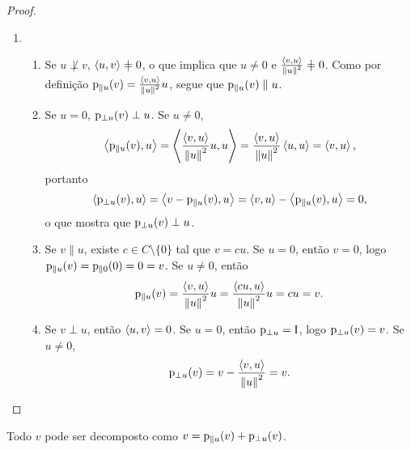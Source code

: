 \begin{proof}
\begin{enumerate}
\begin{comment}
\end{comment}


	\item	
		\begin{enumerate}
		\item Se $u \not\perp v$, $\inte{u}{v} \neq 0$, o que implica que $u \neq 0$ e $\frac{\inte{v}{u}}{\nor{u}^2} \neq 0$. Como por definição $\mathrm{p}_{\parallel u}(v) = \frac{\left\langle{v},{u}\right\rangle}{\left\Vert{u}\right\Vert^2}u$, segue que $\mathrm{p}_{\parallel u}(v) \parallel u$.
		
		\item Se $u = 0$, $\mathrm{p}_{\perp u}(v) \perp u$. Se $u \neq 0$,
	\begin{align*}
	\left\langle{\mathrm{p}_{\parallel u}(v)},{u}\right\rangle = \left\langle{\frac{\left\langle{v},{u}\right\rangle}{\left\Vert{u}\right\Vert^2}u},{u}\right\rangle = \frac{\left\langle{v},{u}\right\rangle}{\left\Vert{u}\right\Vert^2}\left\langle{u},{u}\right\rangle = \left\langle{v},{u}\right\rangle,
	\end{align*}
portanto
	\begin{align*}
	\left\langle{\mathrm{p}_{\perp u}(v)},{u}\right\rangle = \left\langle{v - \mathrm{p}_{\parallel u}(v)},{u}\right\rangle = \left\langle{v},{u}\right\rangle - \left\langle{\mathrm{p}_{\parallel u}(v)},{u}\right\rangle = 0,
	\end{align*}
o que mostra que $\mathrm{p}_{\perp u}(v) \perp u$.
		
		\item Se $v \parallel u$, existe $c \in C \setminus \{0\}$ tal que $v = cu$. Se $u = 0$, então $v=0$, logo $\mathrm{p}_{\parallel u}(v) = \mathrm{p}_{\parallel 0}(0) = 0 = v$. Se $u \neq 0$, então
		\begin{equation*}
		\mathrm{p}_{\parallel u}(v) = \frac{\left\langle{v},{u}\right\rangle}{\left\Vert{u}\right\Vert^2}u = \frac{\left\langle{cu},{u}\right\rangle}{\left\Vert{u}\right\Vert^2}u = cu = v.
		\end{equation*}
		
		\item Se $v \perp u$, então $\left\langle{u},{v}\right\rangle=0$. Se $u=0$, então $\mathrm{p}_{\perp u} = \mathrm{I}$, logo $\mathrm{p}_{\perp u}(v) = v$. Se $u \neq 0$,
	\begin{equation*}
	\mathrm{p}_{\perp u}(v) = v - \frac{\left\langle{v},{u}\right\rangle}{\left\Vert{u}\right\Vert^2} = v.
	\end{equation*}
		\end{enumerate}
	\end{enumerate}
\end{proof}

Todo $v$ pode ser decomposto como $v = \mathrm{p}_{\parallel u}(v) + \mathrm{p}_{\perp u}(v)$.

